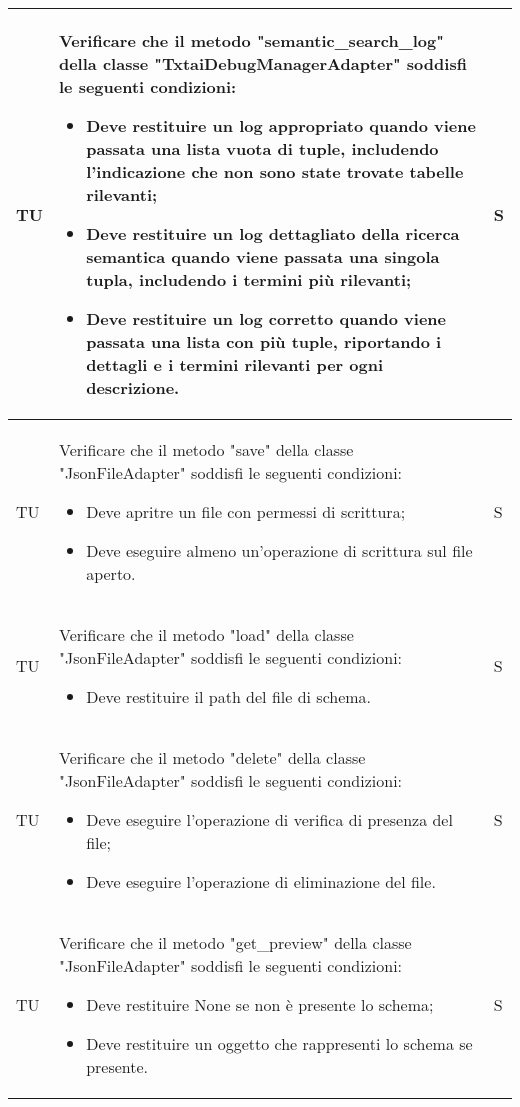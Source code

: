 \begin{adjustwidth}{-0.5cm}{-0.5cm}
\begin{longtable}{|P{1.5cm}|>{\raggedright}P{9.5cm}|>{\arraybackslash}P{1.5cm}|}
		\hline TU & Verificare che il metodo "semantic\_search\_log" della classe "TxtaiDebugManagerAdapter" soddisfi le seguenti condizioni:
	\begin{itemize}
		\item Deve restituire un log appropriato quando viene passata una lista vuota di tuple, includendo l'indicazione che non sono state trovate tabelle rilevanti;
		\item Deve restituire un log dettagliato della ricerca semantica quando viene passata una singola tupla, includendo i termini più rilevanti;
		\item Deve restituire un log corretto quando viene passata una lista con più tuple, riportando i dettagli e i termini rilevanti per ogni descrizione.
	\end{itemize} & S \\

		\hline TU & Verificare che il metodo "save" della classe "JsonFileAdapter" soddisfi le seguenti condizioni:
	\begin{itemize}
		\item Deve apritre un file con permessi di scrittura;
		\item Deve eseguire almeno un'operazione di scrittura sul file aperto.
	\end{itemize} & S \\

		\hline TU & Verificare che il metodo "load" della classe "JsonFileAdapter" soddisfi le seguenti condizioni:
	\begin{itemize}
		\item Deve restituire il path del file di schema.
	\end{itemize} & S \\

		\hline TU & Verificare che il metodo "delete" della classe "JsonFileAdapter" soddisfi le seguenti condizioni:
	\begin{itemize}
		\item Deve eseguire l'operazione di verifica di presenza del file;
		\item Deve eseguire l'operazione di eliminazione del file.
	\end{itemize} & S \\

		\hline TU & Verificare che il metodo "get\_preview" della classe "JsonFileAdapter" soddisfi le seguenti condizioni:
	\begin{itemize}
		\item Deve restituire None se non è presente lo schema;
		\item Deve restituire un oggetto che rappresenti lo schema se presente.
	\end{itemize} & S \\


\end{longtable}
\end{adjustwidth}
